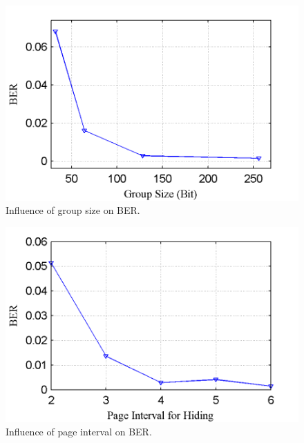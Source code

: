 \begin{figure} 
\begin{center} 
\includegraphics[width=\mywidth]{figs/groupsize.png} 
\caption{Influence of group size on BER.}
\label{fig:groupsize} 
\vspace{-0.1in}

\end{center} 
\end{figure}


\begin{figure} 
\begin{center} 
\includegraphics[width=\mywidth]{figs/page_intv.png} 
\caption{Influence of page interval on BER.}
\label{fig:pageintv} 
\vspace{-0.1in}

\end{center} 
\end{figure}


